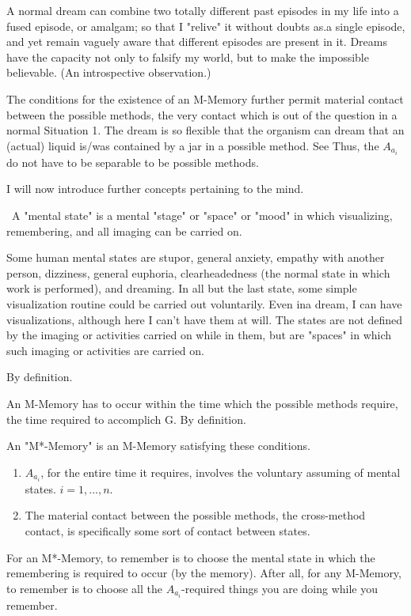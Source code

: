 \documentclass[10pt,twoside]{memoir}
\begin{document}
\begin{enumerate}
{\begin{enumerate}
\begin{sysrules}
\begin{sysrules}
\begin{sysrules}
\begin{sysrules}
{\begin{enumerate}
 A normal dream can combine two totally different 
past episodes in my life into a fused episode, or amalgam; so that I "relive" it 
without doubts as.a single episode, and yet remain vaguely aware that 
different episodes are present in it. Dreams have the capacity not only to 
falsify my world, but to make the impossible believable. (An introspective 
observation.) 

 The conditions for the existence of an M-Memory 
further permit material contact between the possible methods, the very 
contact which is out of the question in a normal Situation 1. The dream is so 
flexible that the organism can dream that an (actual) liquid is\slash was contained 
by a jar in a possible method. See  Thus, the $A_{a_i}$ do not have 
to be separable to be possible methods. 

I will now introduce further concepts pertaining to the mind. 

\ A "mental state" is a mental "stage" or "space" or "mood" 
in which visualizing, remembering, and all imaging can be carried on. 

Some human mental states are stupor, general anxiety, empathy with 
another person, dizziness, general euphoria, clearheadedness (the normal 
state in which work is performed), and dreaming. In all but the last state, 
some simple visualization routine could be carried out voluntarily. Even ina 
dream, I can have visualizations, although here I can't have them at will. The 
states are not defined by the imaging or activities carried on while in them, 
but are "spaces" in which such imaging or activities are carried on. 

By definition. 

 An M-Memory has to occur within the time which the 
possible methods require, the time required to accomplich G. By definition. 

 An "M*-Memory" is an M-Memory satisfying these 
conditions. 
\begin{enumerate}
\item $A_{a_i}$, for the entire time it requires, involves the voluntary 
assuming of mental states. $i=1,...,n$.
\item The material contact between the 
possible methods, the cross-method contact, is specifically some sort of 
contact between states. 
\end{enumerate}

 For an M*-Memory, to remember is to choose the 
mental state in which the remembering is required to occur (by the 
memory). After all, for any M-Memory, to remember is to choose all the 
$A_{a_i}$-required things you are doing while you remember. 


\end{enumerate}}
\end{sysrules}
\end{sysrules}
\end{sysrules}
\end{sysrules}
\end{enumerate}}
\end{enumerate}
\end{document}
